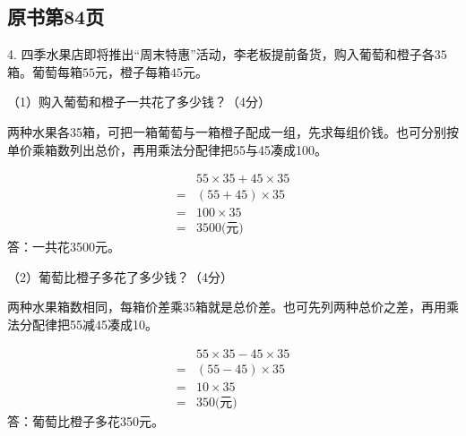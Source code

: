 

\subsection*{原书第84页}

4. 四季水果店即将推出“周末特惠”活动，李老板提前备货，购入葡萄和橙子各\(35\)箱。葡萄每箱\(55\)元，橙子每箱\(45\)元。\par （1）购入葡萄和橙子一共花了多少钱？（4分）\par
\begin{BookAnswer}
两种水果各35箱，可把一箱葡萄与一箱橙子配成一组，先求每组价钱。也可分别按单价乘箱数列出总价，再用乘法分配律把55与45凑成100。\par \[\begin{aligned}&55\times35+45\times35\\={}&(55+45)\times35\\={}&100\times35\\={}&3500\text{(元)}\end{aligned}\]答：一共花3500元。
\end{BookAnswer}

（2）葡萄比橙子多花了多少钱？（4分）\par
\begin{BookAnswer}
两种水果箱数相同，每箱价差乘35箱就是总价差。也可先列两种总价之差，再用乘法分配律把55减45凑成10。\par \[\begin{aligned}&55\times35-45\times35\\={}&(55-45)\times35\\={}&10\times35\\={}&350\text{(元)}\end{aligned}\]答：葡萄比橙子多花350元。
\end{BookAnswer}

